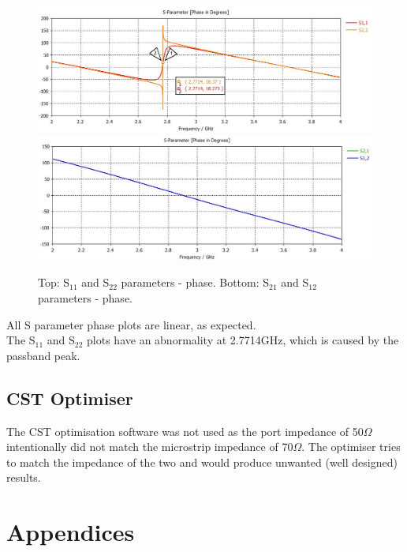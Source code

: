 \documentclass{paper}
\begin{document}
\begin{figure}[H]
	\centering
	\includegraphics[scale=0.4]{IMG/S11_and_S22_phase}
	\includegraphics[scale=0.4]{IMG/S21_and_S12_phase}
	\caption{Top: S$_{11}$ and S$_{22}$ parameters - phase. Bottom: S$_{21}$ and S$_{12}$ parameters - phase.}
	\label{fig:s11_s22_s21_s12_phase}
\end{figure}


All S parameter phase plots are linear, as expected. \\

The S$_{11}$ and S$_{22}$ plots have an abnormality at 2.7714GHz, which is caused by the passband peak.\\

\subsection{CST Optimiser}
The CST optimisation software was not used as the port impedance of 50$\Omega$ intentionally did not match the microstrip impedance of 70$\Omega$. The optimiser tries to match the impedance of the two and would produce unwanted (well designed) results.

\newpage
\section{Appendices}
\end{document}
